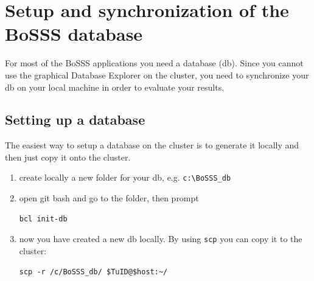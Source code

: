 \documentclass[11pt,twoside,a4paper]{fdyartcl}
\begin{document}
\section{Setup and synchronization of the BoSSS database}
\label{sec:BoSSSdb}
For most of the BoSSS applications you need a database (db). Since you cannot use the graphical Database Explorer on the cluster, you need to synchronize your db on your local machine in order to evaluate your results.

\subsection{Setting up a database}
\label{sec:setup_db}
The easiest way to setup a database on the cluster is to generate it locally and then just copy it onto the cluster.
\begin{enumerate}
\item create locally a new folder for your db, e.g. \verb|c:\BoSSS_db|
\item open git bash and go to the folder, then prompt
\begin{verbatim}
bcl init-db
\end{verbatim}
\item now you have created a new db locally. By using \verb|scp| you can copy it to the cluster:
\begin{verbatim}
scp -r /c/BoSSS_db/ $TuID@$host:~/
\end{verbatim}
\end{enumerate}
\end{document}
